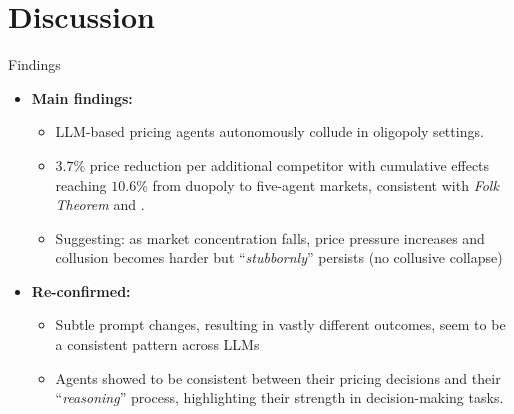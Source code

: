 \documentclass[10pt, aspectratio=169]{beamer}
\begin{document}
\section{Discussion}

\begin{frame}{Findings}
    \begin{itemize}
        \item \textbf{Main findings:}
        \begin{itemize}
            \item LLM-based pricing agents autonomously collude in oligopoly settings.
            \item $3.7\%$ price reduction per additional competitor with cumulative effects reaching $10.6\%$ from duopoly to five-agent markets, consistent with \textit{Folk Theorem} and \textcite{calvano_artificial_2020}.
            \item Suggesting: as market concentration falls, price pressure increases and collusion becomes harder but \enquote{\emph{stubbornly}} persists (no collusive collapse)
        \end{itemize}
        \item \textbf{Re-confirmed:}
        \begin{itemize}
            \item Subtle prompt changes, resulting in vastly different outcomes, seem to be a consistent pattern across LLMs
            \item Agents showed to be consistent between their pricing decisions and their \enquote{\emph{reasoning}} process, highlighting their strength in decision-making tasks.
        \end{itemize}
    \end{itemize}
\end{frame}
\end{document}
